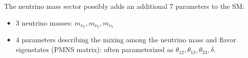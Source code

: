 The neutrino mass sector possibly adds an additional 7 parameters \cite{pmns} to the SM:
\begin{itemize}
\item 3 neutrino masses: $m_{\nu_{1}}, m_{\nu_{2}}, m_{\nu_{3}}$
\item 4 parameters describing the mixing among the neutrino mass and flavor eigenstates (PMNS matrix): often parameterized as $\theta_{12}, \theta_{13}, \theta_{23}, \delta$.
\end{itemize}
